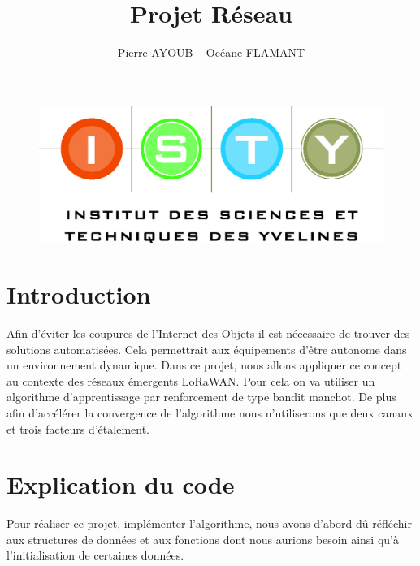 \documentclass[12pt,a4paper]{article}
\begin{document}
\title{Projet Réseau}
\author{Pierre AYOUB -- Océane FLAMANT}

\maketitle

\begin{figure}[b]
    \centering
    \includegraphics[scale=0.3]{figures/isty.jpg}
\end{figure}


\tableofcontents

\section{Introduction}
\label{sec.intro}
Afin d'éviter les coupures de l'Internet des Objets il est nécessaire de 
trouver des solutions automatisées. Cela permettrait aux équipements 
d'être autonome dans un environnement dynamique.
Dans ce projet, nous allons appliquer ce concept au contexte des réseaux 
émergents LoRaWAN. Pour cela on va utiliser un algorithme d'apprentissage par
renforcement de type bandit manchot. De plus afin d'accélérer la convergence 
de l'algorithme nous n'utiliserons que deux canaux et trois facteurs 
d'étalement.



\section{Explication du code}
\label{sec.expl}

Pour réaliser ce projet, implémenter l'algorithme, nous avons d'abord dû 
réfléchir aux structures de données et aux fonctions dont nous aurions 
besoin ainsi qu'à l'initialisation de certaines données.
\end{document}
